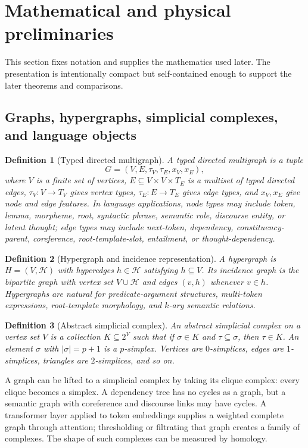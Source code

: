 \documentclass[11pt]{article}
\newtheorem{definition}{Definition}[section]
\newcommand{\1}{\mathbf{1}}
\begin{document}
\section{Mathematical and physical preliminaries}

This section fixes notation and supplies the mathematics used later. The presentation is intentionally compact but self-contained enough to support the later theorems and comparisons.

\subsection{Graphs, hypergraphs, simplicial complexes, and language objects}

\begin{definition}[Typed directed multigraph]
A typed directed multigraph is a tuple
\[
G=(V,E,\tau_V,\tau_E,x_V,x_E),
\]
where $V$ is a finite set of vertices, $E\subseteq V\times V\times T_E$ is a multiset of typed directed edges, $\tau_V:V\to T_V$ gives vertex types, $\tau_E:E\to T_E$ gives edge types, and $x_V,x_E$ give node and edge features. In language applications, node types may include token, lemma, morpheme, root, syntactic phrase, semantic role, discourse entity, or latent thought; edge types may include next-token, dependency, constituency-parent, coreference, root-template-slot, entailment, or thought-dependency.
\end{definition}

\begin{definition}[Hypergraph and incidence representation]
A hypergraph is $H=(V,\mathcal{H})$ with hyperedges $h\in\mathcal{H}$ satisfying $h\subseteq V$. Its incidence graph is the bipartite graph with vertex set $V\cup\mathcal{H}$ and edges $(v,h)$ whenever $v\in h$. Hypergraphs are natural for predicate-argument structures, multi-token expressions, root-template morphology, and $k$-ary semantic relations.
\end{definition}

\begin{definition}[Abstract simplicial complex]
An abstract simplicial complex on a vertex set $V$ is a collection $K\subseteq 2^V$ such that if $\sigma\in K$ and $\tau\subseteq\sigma$, then $\tau\in K$. An element $\sigma$ with $|\sigma|=p+1$ is a $p$-simplex. Vertices are $0$-simplices, edges are $1$-simplices, triangles are $2$-simplices, and so on.
\end{definition}

A graph can be lifted to a simplicial complex by taking its clique complex: every clique becomes a simplex. A dependency tree has no cycles as a graph, but a semantic graph with coreference and discourse links may have cycles. A transformer layer applied to token embeddings supplies a weighted complete graph through attention; thresholding or filtrating that graph creates a family of complexes. The shape of such complexes can be measured by homology.
\end{document}

